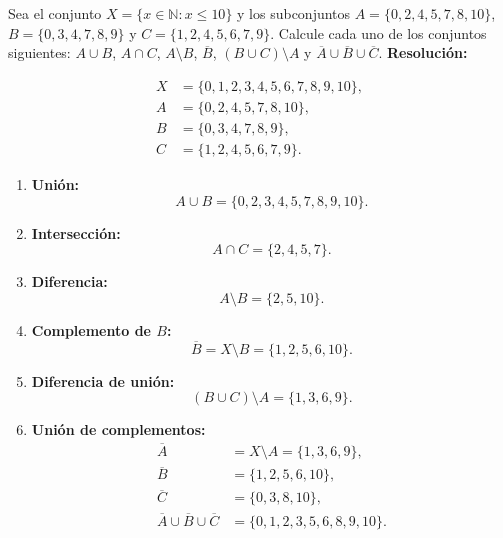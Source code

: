 \documentclass[a4paper,12pt]{article}
\begin{document}
\begin{ejercicio}[title=Ejercicio 1]
Sea el conjunto $X = \{x \in \mathbb{N} : x \le 10\}$ y los subconjuntos 
$A = \{0,2,4,5,7,8,10\}$, 
$B = \{0,3,4,7,8,9\}$ y 
$C = \{1,2,4,5,6,7,9\}$.
Calcule cada uno de los conjuntos siguientes: 
$A \cup B$, 
$A \cap C$, 
$A \setminus B$, 
$\overline{B}$, 
$(B \cup C)\setminus A$ y 
$\overline{A} \cup \overline{B} \cup \overline{C}$.
\tcblower
\textbf{Resolución:}

\[
\begin{aligned}
X &= \{0,1,2,3,4,5,6,7,8,9,10\},\\
A &= \{0,2,4,5,7,8,10\},\\
B &= \{0,3,4,7,8,9\},\\
C &= \{1,2,4,5,6,7,9\}.
\end{aligned}
\]

\begin{enumerate}
\item \textbf{Unión:}
\[
A \cup B = \boxed{\{0,2,3,4,5,7,8,9,10\}}.
\]

\item \textbf{Intersección:}
\[
A \cap C = \boxed{\{2,4,5,7\}}.
\]

\item \textbf{Diferencia:}
\[
A \setminus B = \boxed{\{2,5,10\}}.
\]

\item \textbf{Complemento de \(B\):}
\[
\overline{B} = X \setminus B = \boxed{\{1,2,5,6,10\}}.
\]

\item \textbf{Diferencia de unión:}
\[
(B \cup C)\setminus A = \boxed{\{1,3,6,9\}}.
\]

\item \textbf{Unión de complementos:}
\[
\begin{aligned}
\overline{A} &= X \setminus A = \{1,3,6,9\},\\
\overline{B} &= \{1,2,5,6,10\},\\
\overline{C} &= \{0,3,8,10\},\\[4pt]
\overline{A} \cup \overline{B} \cup \overline{C} &= \boxed{\{0,1,2,3,5,6,8,9,10\}}.
\end{aligned}
\]
\end{enumerate}

\end{ejercicio}
\end{document}
